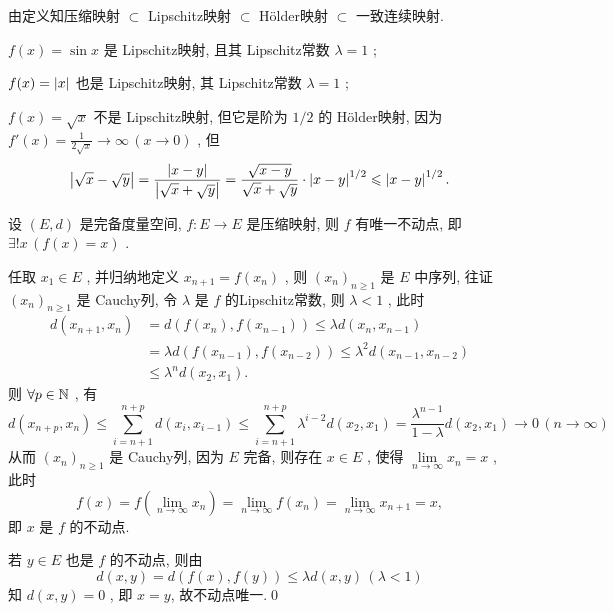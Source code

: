 	\begin{Remark}
		由定义知压缩映射 $ \subset $ Lipschitz映射 $ \subset $ H\"older映射 $ \subset $ 一致连续映射.
	\end{Remark}

	\begin{Example}
		$ f(x)=\sin x $ 是 Lipschitz映射, 且其 Lipschitz常数 $ \lambda=1 $ ;

		$ f(x)=\left| x \right|  $ 也是 Lipschitz映射, 其 Lipschitz常数 $ \lambda=1 $ ;

		$ f(x)=\sqrt{x} $ 不是 Lipschitz映射, 但它是阶为 $ 1/2 $ 的 H\"older映射, 因为 $ f'(x)=\frac{1}{2\sqrt{x}}\to\infty\,(x\to 0) $ , 但
		\[
			\left| \sqrt{x}-\sqrt{y} \right| =\frac{\left| x-y \right| }{\left| \sqrt{x}+\sqrt{y} \right| }=\frac{\sqrt{x-y}}{\sqrt{x}+\sqrt{y}}\cdot\left| x-y \right| ^{1/2}\leqslant\left| x-y \right| ^{1/2}.
		\]
	\end{Example}

	\begin{Theorem}[压缩映照原理]\label{thm:压缩映照原理}
		设 $ (E, d) $ 是完备度量空间,  $ f:E\to E $ 是压缩映射, 则 $ f $ 有唯一不动点, 即 $ \exists!x\,(f(x)=x) $ .
	\end{Theorem}

	\begin{Proof}
		任取 $ x_{1}\in E $ , 并归纳地定义 $ x_{n+1}=f(x_{n}) $ , 则 $ (x_{n})_{n\geqslant1} $ 是 $ E $ 中序列, 往证 $ (x_{n})_{n\geqslant1} $ 是 Cauchy列, 令 $ \lambda $ 是 $ f $ 的Lipschitz常数, 则 $ \lambda<1 $ , 此时
		\[
			\begin{aligned}
				d(x_{n+1}, x_{n}) & = d(f(x_{n}), f(x_{n-1})) \leqslant \lambda d(x_{n}, x_{n-1}) \\
				& =\lambda d(f(x_{n-1}), f(x_{n-2}))\leqslant \lambda^{2} d(x_{n-1}, x_{n-2}) \\
				& \leqslant \lambda^{n} d(x_{2}, x_{1}).
			\end{aligned}
		\]
		则 $ \forall p\in \mathbb{N} $ , 有
		\[
			d(x_{n+p}, x_{n})\leqslant\sum_{i=n+1}^{n+p}d(x_{i}, x_{i-1})\leqslant\sum_{i=n+1}^{n+p}\lambda^{i-2}d(x_{2}, x_{1})=\frac{\lambda^{n-1}}{1-\lambda}d(x_{2}, x_{1})\to 0\,(n\to\infty)
		\]
		从而 $ (x_{n})_{n\geqslant1} $ 是 Cauchy列, 因为 $ E $ 完备, 则存在 $ x\in E $ , 使得 $ \lim\limits_{n\to \infty}x_{n}=x $ , 此时
		\[
			f(x)=f(\lim_{n\to\infty}x_{n})=\lim_{n\to\infty}f(x_{n})=\lim_{n\to\infty}x_{n+1}=x,
		\]
		即 $ x $ 是 $ f $ 的不动点.

		若 $ y\in E $ 也是 $ f $ 的不动点, 则由
		\[
			d(x, y)=d(f(x), f(y))\leqslant\lambda d(x, y)\,(\lambda<1)
		\]
		知 $ d(x, y)=0 $ , 即 $ x=y $, 故不动点唯一.\qed
	\end{Proof}




